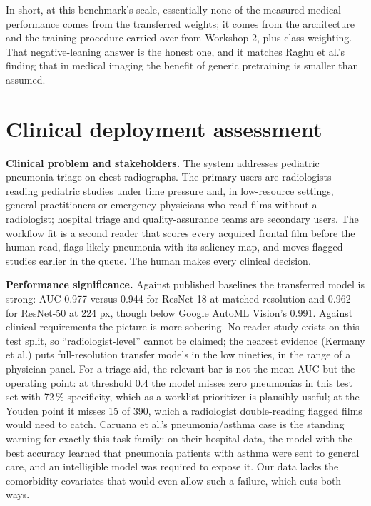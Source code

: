 \documentclass[11pt,a4paper]{article}
\begin{document}
In short, at this benchmark's scale, essentially none of the measured medical performance comes from the transferred weights; it comes from the architecture and the training procedure carried over from Workshop 2, plus class weighting. That negative-leaning answer is the honest one, and it matches Raghu et al.'s finding that in medical imaging the benefit of generic pretraining is smaller than assumed.

\section{Clinical deployment assessment}

\textbf{Clinical problem and stakeholders.} The system addresses pediatric pneumonia triage on chest radiographs. The primary users are radiologists reading pediatric studies under time pressure and, in low-resource settings, general practitioners or emergency physicians who read films without a radiologist; hospital triage and quality-assurance teams are secondary users. The workflow fit is a second reader that scores every acquired frontal film before the human read, flags likely pneumonia with its saliency map, and moves flagged studies earlier in the queue. The human makes every clinical decision.

\textbf{Performance significance.} Against published baselines the transferred model is strong: AUC 0.977 versus 0.944 for ResNet-18 at matched resolution and 0.962 for ResNet-50 at 224 px, though below Google AutoML Vision's 0.991. Against clinical requirements the picture is more sobering. No reader study exists on this test split, so ``radiologist-level'' cannot be claimed; the nearest evidence (Kermany et al.) puts full-resolution transfer models in the low nineties, in the range of a physician panel. For a triage aid, the relevant bar is not the mean AUC but the operating point: at threshold 0.4 the model misses zero pneumonias in this test set with 72\,\% specificity, which as a worklist prioritizer is plausibly useful; at the Youden point it misses 15 of 390, which a radiologist double-reading flagged films would need to catch. Caruana et al.'s pneumonia/asthma case is the standing warning for exactly this task family: on their hospital data, the model with the best accuracy learned that pneumonia patients with asthma were sent to general care, and an intelligible model was required to expose it. Our data lacks the comorbidity covariates that would even allow such a failure, which cuts both ways.
\end{document}
